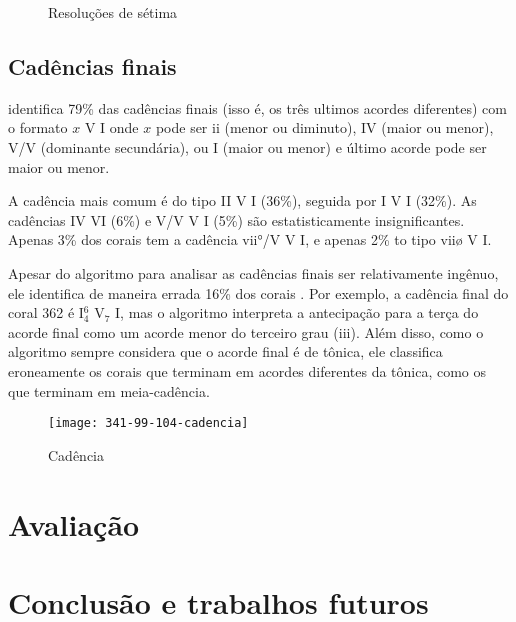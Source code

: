 \begin{figure}
  \centering
  \caption{Resoluções de sétima}
  \label{fig:setima-resol}
\end{figure}

\subsection{Cadências finais}
\label{sec:cadencias}

\rameau{} identifica 79\% das cadências finais (isso é, os três
ultimos acordes diferentes) com o formato $x$ V I onde $x$ pode ser ii
(menor ou diminuto), IV (maior ou menor), V/V (dominante secundária),
ou I (maior ou menor) e último acorde pode ser maior ou menor.

A cadência mais comum é do tipo II V I (36\%), seguida por I V I
(32\%). As cadências IV VI (6\%) e V/V V I (5\%) são estatisticamente
insignificantes. Apenas 3\% dos corais tem a cadência vii°/V V I, e
apenas 2\% to tipo viiø V I.

Apesar do algoritmo para analisar as cadências finais ser
relativamente ingênuo, ele identifica de maneira errada 16\% dos
corais . Por
exemplo, a cadência final do coral 362 é I$^6_4$ V$_7$ I, mas o algoritmo
interpreta a antecipação para a terça do acorde final como um acorde
menor do terceiro grau (iii). Além disso, como o algoritmo sempre
considera que o acorde final é de tônica, ele classifica eroneamente
os corais que terminam em acordes diferentes da tônica, como os que
terminam em meia-cadência.

\begin{figure}
  \centering
  \texttt{[image: 341-99-104-cadencia]}
  \caption{Cadência}
  \label{fig:cadencia}
\end{figure}

\section{Avaliação}
\label{sec:avaliacao}

\section{Conclusão e trabalhos futuros}
\label{sec:concl-e-trab}

